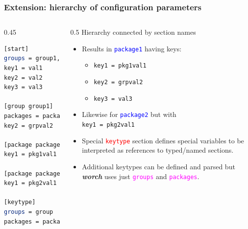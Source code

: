 \documentclass[xcolor=dvipsnames]{beamer}
\newcommand{\app}[1]{\textbf{\textit{#1}}\xspace}
\def\worch{\app{worch}}
\begin{document}
\begin{frame}[fragile]
  \frametitle{Extension: hierarchy of configuration parameters} 

  \begin{columns}
    \begin{column}{0.45\textwidth}
  \begin{lstlisting}[language=bash,emph={start,group,package,keytype},emphstyle=\color{red},emph={[2]group1,package1},emphstyle={[2]\color{blue}},emph={[3]groups,packages},emphstyle={[3]\color{magenta}}]
[start]
groups = group1, group2
key1 = val1
key2 = val2
key3 = val3

[group group1]
packages = package1, package2
key2 = grpval2

[package package1]
key1 = pkg1val1

[package package2]
key1 = pkg2val1

[keytype]
groups = group
packages = package
  \end{lstlisting}
    \end{column}
    \begin{column}{0.5\paperwidth}
      \small
      Hierarchy connected by section names
      \begin{itemize}
      \item Results in \textcolor{blue}{\texttt{package1}} having keys: 
        \begin{itemize}
        \item \texttt{key1 = pkg1val1}
        \item \texttt{key2 = grpval2}
        \item \texttt{key3 = val3}      
        \end{itemize}
      \item Likewise for \textcolor{blue}{\texttt{package2}} but with \\
        \texttt{key1 = pkg2val1}
      \item Special \textcolor{red}{\texttt{keytype}} section defines special variables to be
        interpreted as references to typed/named sections.
      \item Additional keytypes can be defined and parsed but \worch uses just \textcolor{magenta}{\texttt{groups}}
        and \textcolor{magenta}{\texttt{packages}}.
      \end{itemize}
    \end{column}
  \end{columns}

\end{frame}
\end{document}

